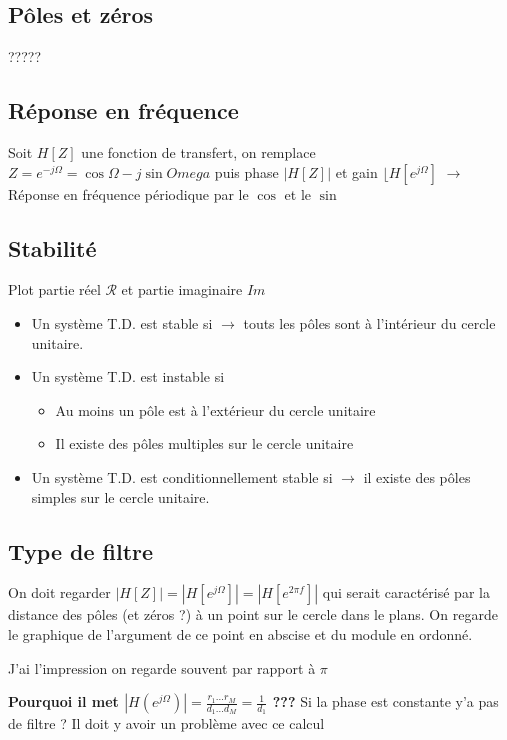 \documentclass{article}
\theoremstyle{plain}%
\theoremstyle{definition}
\theoremstyle{remark}
\begin{document}
\subsection{Pôles et zéros}
?????

\subsection{Réponse en fréquence}
Soit $ H[Z] $ une fonction de transfert, on remplace $ Z = e^{-j \Omega } = \cos \Omega - j \sin Omega $ puis phase $ \left| H[Z] \right|  $ et gain $ \lfloor H[e^{j \Omega }] $ 
$\rightarrow$ Réponse en fréquence périodique par le $ \cos  $ et le $ \sin  $ 


\subsection{Stabilité}
Plot partie réel $ \mathcal{R} $ et partie imaginaire $ Im $ 
\begin{itemize}
    \item Un système T.D. est stable si $\rightarrow$ touts les pôles sont à l'intérieur du cercle unitaire.
    \item Un système T.D. est instable si \begin{itemize}
        \item Au moins un pôle est à l'extérieur du cercle unitaire
        \item Il existe des pôles multiples sur le cercle unitaire
    \end{itemize}
    \item Un système T.D. est conditionnellement stable si $\rightarrow$ il existe des pôles simples sur le cercle unitaire.
\end{itemize}

\subsection{Type de filtre}
On doit regarder $ \left| H[Z] \right| = \left| H[e^{j \Omega }] \right| = \left| H[e^{2 \pi f}] \right| $ qui serait caractérisé par la distance des pôles (et zéros ?) à un point sur le cercle dans le plans. On regarde le graphique de l'argument de ce point en abscise et du module en ordonné.

J'ai l'impression on regarde souvent par rapport à $ \pi  $ 

\textbf{Pourquoi il met $ \left| H(e^{j \Omega }) \right|  = \frac{r_1\dots r_M}{d_1\dots d_M} = \frac{1}{d_1}$ ??? } Si la phase est constante y'a pas de filtre ? Il doit y avoir un problème avec ce calcul
\end{document}
